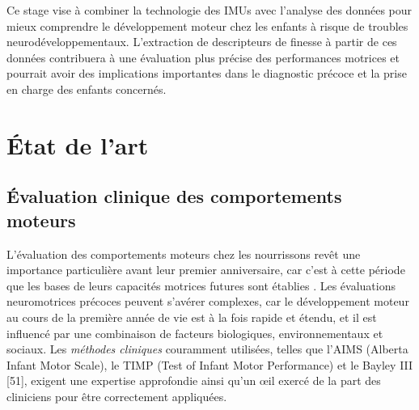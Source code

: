 \documentclass[8pt]{article}
\begin{document}
Ce stage vise à combiner la technologie des IMUs avec l'analyse des données pour mieux comprendre le développement moteur chez les enfants à risque de troubles neurodéveloppementaux. L'extraction de descripteurs de finesse à partir de ces données contribuera à une évaluation plus précise des performances motrices et pourrait avoir des implications importantes dans le diagnostic précoce et la prise en charge des enfants concernés.


\newpage
\section{État de l'art}
\subsection{Évaluation clinique des comportements moteurs}
\label{subsec: assess_sensor}

\par L'évaluation des comportements moteurs chez les nourrissons revêt une importance particulière avant leur premier anniversaire, car c'est à cette période que les bases de leurs capacités motrices futures sont établies \cite{adolph_physical_2005}.  Les évaluations neuromotrices précoces peuvent s'avérer complexes, car le développement moteur au cours de la première année de vie est à la fois rapide et étendu, et il est influencé par une combinaison de facteurs biologiques, environnementaux et sociaux. Les \textit{méthodes cliniques} couramment utilisées, telles que l'AIMS (Alberta Infant Motor Scale), le TIMP (Test of Infant Motor Performance) et le Bayley III [51], exigent une expertise approfondie ainsi qu'un œil exercé de la part des cliniciens pour être correctement appliquées.\\
\end{document}
